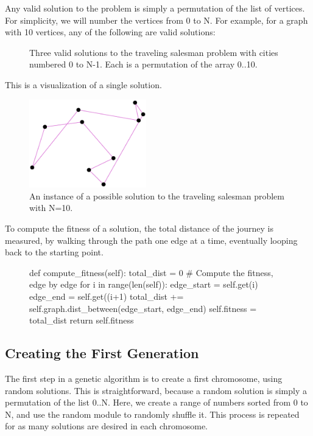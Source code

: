 Any valid solution to the problem is simply a permutation of the list of vertices. For simplicity, we will number the vertices from 0 to N. For example, for a graph with 10 vertices, any of the following are valid solutions:

\begin{figure}[H]
\begin{python}
[2, 3, 4, 8, 9, 6, 1, 5, 7, 0]
[8, 0, 6, 2, 4, 3, 1, 9, 5, 7]
[9, 0, 5, 3, 7, 4, 8, 6, 1, 2]
\end{python}
\caption{Three valid solutions to the traveling salesman problem with cities numbered 0 to N-1. Each is a permutation of the array 0..10.}
\end{figure}

This is a visualization of a single solution.

\begin{figure}[H]
\centering
\includegraphics[width=2in]{images/single_solution.eps}
\caption{An instance of a possible solution to the traveling salesman problem with N=10.}
\end{figure}

To compute the fitness of a solution, the total distance of the journey is measured, by walking through the path one edge at a time, eventually looping back to the starting point.

\begin{figure}[H]
\begin{python}
def compute_fitness(self):
  total_dist = 0
  # Compute the fitness, edge by edge
  for i in range(len(self)):
    edge_start = self.get(i)
    edge_end = self.get((i+1)%
    total_dist += self.graph.dist_between(edge_start, edge_end)
  self.fitness = total_dist
  return self.fitness
\end{python}
\end{figure}

\subsection{Creating the First Generation}

The first step in a genetic algorithm is to create a first chromosome, using random solutions. This is straightforward, because a random solution is simply a permutation of the list 0..N. Here, we create a range of numbers sorted from 0 to N, and use the random module to randomly shuffle it. This process is repeated for as many solutions are desired in each chromosome.

